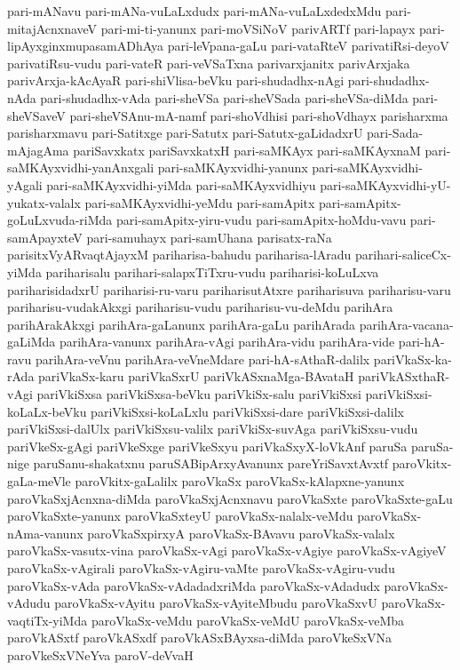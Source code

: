 {pari-mANavu
pari-mANa-vuLaLxdudx
pari-mANa-vuLaLxdedxMdu
pari-mitajAcnxnaveV
pari-mi-ti-yanunx
pari-moVSiNoV
parivARTf
pari-lapayx
pari-lipAyxginxmupasamADhAya
pari-leVpana-gaLu
pari-vataRteV
parivatiRsi-deyoV
parivatiRsu-vudu
pari-vateR
pari-veVSaTxna
parivarxjanitx
parivArxjaka
parivArxja-kAcAyaR
pari-shiVlisa-beVku
pari-shudadhx-nAgi
pari-shudadhx-nAda
pari-shudadhx-vAda
pari-sheVSa
pari-sheVSada
pari-sheVSa-diMda
pari-sheVSaveV
pari-sheVSAnu-mA-namf
pari-shoVdhisi
pari-shoVdhayx
parisharxma
parisharxmavu
pari-Satitxge
pari-Satutx
pari-Satutx-gaLidadxrU
pari-Sada-mAjagAma
pariSavxkatx
pariSavxkatxH
pari-saMKAyx
pari-saMKAyxnaM
pari-saMKAyxvidhi-yanAnxgali
pari-saMKAyxvidhi-yanunx
pari-saMKAyxvidhi-yAgali
pari-saMKAyxvidhi-yiMda
pari-saMKAyxvidhiyu
pari-saMKAyxvidhi-yU-yukatx-valalx
pari-saMKAyxvidhi-yeMdu
pari-samApitx
pari-samApitx-goLuLxvuda-riMda
pari-samApitx-yiru-vudu
pari-samApitx-hoMdu-vavu
pari-samApayxteV
pari-samuhayx
pari-samUhana
parisatx-raNa
parisitxVyARvaqtAjayxM
pariharisa-bahudu
pariharisa-lAradu
parihari-saliceCx-yiMda
pariharisalu
parihari-salapxTiTxru-vudu
pariharisi-koLuLxva
pariharisidadxrU
pariharisi-ru-varu
pariharisutAtxre
pariharisuva
pariharisu-varu
pariharisu-vudakAkxgi
pariharisu-vudu
pariharisu-vu-deMdu
parihAra
parihArakAkxgi
parihAra-gaLanunx
parihAra-gaLu
parihArada
parihAra-vacana-gaLiMda
parihAra-vanunx
parihAra-vAgi
parihAra-vidu
parihAra-vide
pari-hA-ravu
parihAra-veVnu
parihAra-veVneMdare
pari-hA-sAthaR-dalilx
pariVkaSx-ka-rAda
pariVkaSx-karu
pariVkaSxrU
pariVkASxnaMga-BAvataH
pariVkASxthaR-vAgi
pariVkiSxsa
pariVkiSxsa-beVku
pariVkiSx-salu
pariVkiSxsi
pariVkiSxsi-koLaLx-beVku
pariVkiSxsi-koLaLxlu
pariVkiSxsi-dare
pariVkiSxsi-dalilx
pariVkiSxsi-dalUlx
pariVkiSxsu-valilx
pariVkiSx-suvAga
pariVkiSxsu-vudu
pariVkeSx-gAgi
pariVkeSxge
pariVkeSxyu
pariVkaSxyX-loVkAnf
paruSa
paruSa-nige
paruSanu-shakatxnu
paruSABipArxyAvanunx
pareYriSavxtAvxtf
paroVkitx-gaLa-meVle
paroVkitx-gaLalilx
paroVkaSx
paroVkaSx-kAlapxne-yanunx
paroVkaSxjAcnxna-diMda
paroVkaSxjAcnxnavu
paroVkaSxte
paroVkaSxte-gaLu
paroVkaSxte-yanunx
paroVkaSxteyU
paroVkaSx-nalalx-veMdu
paroVkaSx-nAma-vanunx
paroVkaSxpirxyA
paroVkaSx-BAvavu
paroVkaSx-valalx
paroVkaSx-vasutx-vina
paroVkaSx-vAgi
paroVkaSx-vAgiye
paroVkaSx-vAgiyeV
paroVkaSx-vAgirali
paroVkaSx-vAgiru-vaMte
paroVkaSx-vAgiru-vudu
paroVkaSx-vAda
paroVkaSx-vAdadadxriMda
paroVkaSx-vAdadudx
paroVkaSx-vAdudu
paroVkaSx-vAyitu
paroVkaSx-vAyiteMbudu
paroVkaSxvU
paroVkaSx-vaqtiTx-yiMda
paroVkaSx-veMdu
paroVkaSx-veMdU
paroVkaSx-veMba
paroVkASxtf
paroVkASxdf
paroVkASxBAyxsa-diMda
paroVkeSxVNa
paroVkeSxVNeYva
paroV-deVvaH
}
